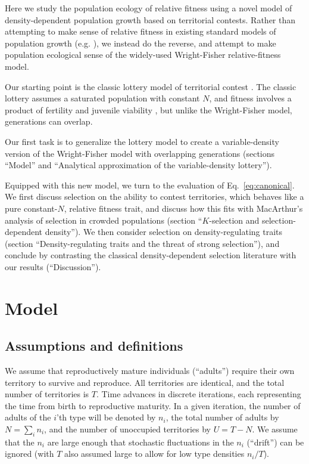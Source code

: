 \documentclass[12pt]{article}
\begin{document}
Here we study the population ecology of relative fitness using a novel model of density-dependent population growth based on territorial contests. Rather than attempting to make sense of relative fitness in existing standard models of population growth (e.g. \citep{kimura1969natural,mallet_2012}), we instead do the reverse, and attempt to make population ecological sense of the widely-used Wright-Fisher relative-fitness model. 

Our starting point is the classic lottery model of territorial contest \citep{sale_77,chesson_1981}. The classic lottery assumes a saturated population with constant $N$, and fitness involves a product of fertility and juvenile viability \citep[pp. 185]{crow_1970}, but unlike the Wright-Fisher model, generations can overlap. 

Our first task is to generalize the lottery model to create a variable-density version of the Wright-Fisher model with overlapping generations (sections ``Model'' and ``Analytical approximation of the variable-density lottery''). 

Equipped with this new model, we turn to the evaluation of Eq.~\eqref{eq:canonical}. We first discuss selection on the ability to contest territories, which behaves like a pure constant-$N$, relative fitness trait, and discuss how this fits with MacArthur's analysis of selection in crowded populations (section ``$K$-selection and selection-dependent density''). We then consider selection on density-regulating traits (section ``Density-regulating traits and the threat of strong selection''), and conclude by contrasting the classical density-dependent selection literature with our results (``Discussion'').
 
\section*{Model}\label{sec:model}

\subsection*{Assumptions and definitions} 

We assume that reproductively mature individuals (``adults'') require their own territory to survive and reproduce. All territories are identical, and the total number of territories is $T$. Time advances in discrete iterations, each representing the time from birth to reproductive maturity. In a given iteration, the number of adults of the $i$'th type will be denoted by $n_i$, the total number of adults by $N=\sum_i n_i$, and the number of unoccupied territories by $U=T-N$. We assume that the $n_i$ are large enough that stochastic fluctuations in the $n_i$ (``drift'') can be ignored (with $T$ also assumed large to allow for low type densities $n_i/T$).
\end{document}
